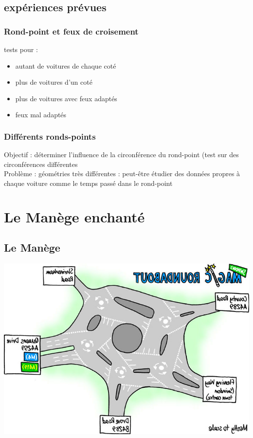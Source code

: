 \documentclass[slidetop,11pt]{beamer}
\begin{document}
	\subsection{expériences prévues}

\begin{frame}
	\frametitle{Rond-point et feux de croisement}
	tests pour :
	\begin{itemize}
		\item autant de voitures de chaque coté
		\item plus de voitures d'un coté
		\item plus de voitures avec feux adaptés
		\item feux mal adaptés
	\end{itemize}
	
	\frametitle{Différents ronds-points}
	Objectif : déterminer l'influence de la circonférence du rond-point (test sur des circonférences différentes \\
	Problème : géométries très différentes : peut-être étudier des données propres à chaque voiture comme le temps passé dans le rond-point
\end{frame}

	
\section{Le Manège enchanté}
	\subsection{Le Manège}
\begin{frame}
	\begin{center}
		\includegraphics[scale=0.4]{./images/magic}
	\end{center}
\end{frame}
\end{document}
